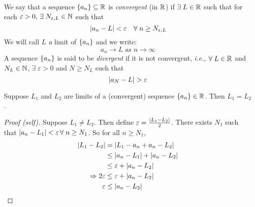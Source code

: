 \documentclass[12pt]{article}
\begin{document}
\begin{defn} \label{defn:convergent seq}
    We say that a sequence $\set{a_{n}} \subseteq \R$ is \emph{convergent} (in $\mathbb{R}$) if $\exists\; L \in \mathbb{R}$ such that for each $\varepsilon > 0, \,\exists\; N_{\varepsilon,L} \in \mathbb{N}$ such that \[
        \abs{ a_{n} - L } < \varepsilon \quad \forall\; n \geq N_{\varepsilon, L}
    \] 
    We will call $L$ \emph{a} limit of $\set{a_{n}}$ and we write: \[
        a_{n} \to L \text{ as } n \to \infty
    \]
    A sequence $\set{a_{n}}$ is said to be \emph{divergent} if it is not convergent, \textit{i.e.}, $\forall\; L \in \mathbb{R}$ and $N_{L} \in \mathbb{N}$, $\exists\; \varepsilon > 0$ and $N \geq N_{L}$ such that \[
        \abs{ a_{N} - L } > \varepsilon
    \]
\end{defn}

\begin{thm} \label{thm:unique limit}
    Suppose $L_{1}$ and $L_{2}$ are limits of a (convergent) sequence $\set{a_{n}} \in \R$. Then $L_{1} = L_{2}$.
\end{thm}
\begin{proof}[Proof \textcolor{red!70!black}{(self)}]
    Suppose $L_{1} \neq L_{2}$. Then define $\varepsilon = \frac{\abs{ L_{1} - L_{2} }}{2}$. There exists $N_{1}$ such that $\abs{ a_{n} - L_{1} } < \varepsilon \,\forall\; n \geq N_{1}$. So for all $n \geq N_{1}$,
    \begin{align*}
        \abs{ L_{1} - L_{2} }  &= \abs{ L_{1} - a_{n} + a_{n} - L_{2} }  \\
                                     &\leq \abs{ a_{n} - L_{1} } + \abs{ a_{n} - L_{2} } \\
                                     &\leq \varepsilon + \abs{ a_{n} - L_{2} }  \\
             \implies 2 \varepsilon  &\leq \varepsilon + \abs{ a_{n} - L_{2} } \\
                         \varepsilon &\leq \abs{ a_{n} - L_{2} } \qedhere
    \end{align*}
\end{proof}
\end{document}
